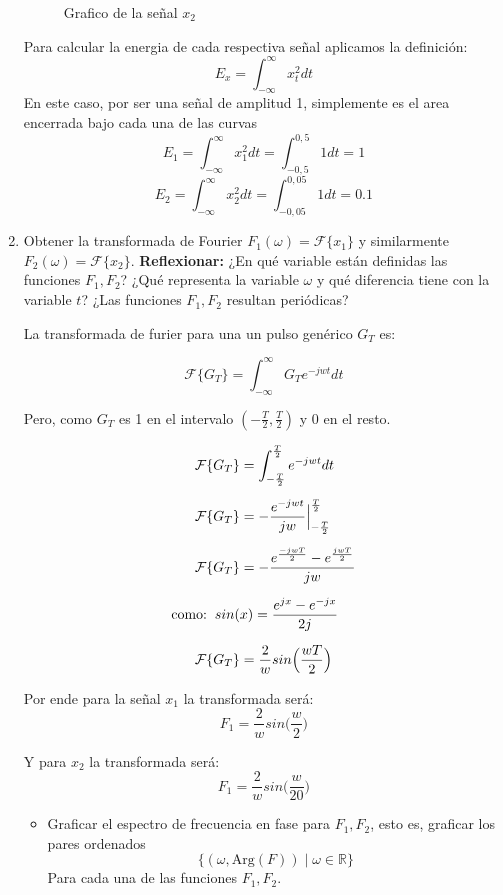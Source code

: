 \documentclass[12pt,a4paper]{report}
\begin{document}
\begin{enumerate}[label=\alph*),left=0pt]
\begin{figure}[h!]
\begin{minipage}{0.45\textwidth}
        \caption{Grafico de la señal $x_2$}
        \label{fig:imagen2}
      \end{minipage}
    \end{figure}

    Para calcular la energia de cada respectiva señal aplicamos la definición:
    $$E_x = \int_{-\infty}^{\infty}x_t^2dt$$
    En este caso, por ser una señal de amplitud 1, simplemente es el area encerrada bajo cada una de las curvas
    $$E_1 = \int_{-\infty}^{\infty}x_1^2dt= \int_{-0,5}^{0,5}1dt=1$$
    $$E_2 = \int_{-\infty}^{\infty}x_2^2dt= \int_{-0,05}^{0,05}1dt=0.1$$

  \item Obtener la transformada de Fourier $F_1(\omega) = \mathcal{F}\{x_1\}$ y similarmente $F_2(\omega) =
    \mathcal{F}\{x_2\}$. \textbf{Reflexionar:} ¿En qué variable están definidas las funciones $F_1, F_2$?
    ¿Qué representa la variable $\omega$ y qué diferencia tiene con la variable $t$? 
    ¿Las funciones $F_1, F_2$ resultan periódicas?

    La transformada de furier para una un pulso genérico $G_T$ es:

    $$\mathcal{F}\{G_T\} = \int_{-\infty}^{\infty}G_T e^{-jwt}dt$$

    Pero, como $G_T$ es 1 en el intervalo $(-\frac{T}{2},\frac{T}{2})$ y 0 en el resto.

    $$
    \begin{aligned}
      \mathcal{F}\{G_T\} &= \int_{-\frac{T}{2}}^{\frac{T}{2}}e^{-jwt}dt \\[6pt]
      \mathcal{F}\{G_T\} &= -\frac{e^{-jwt}}{jw}\Big|^{\frac{T}{2}}_{-\frac{T}{2}} \\[6pt]
      \mathcal{F}\{G_T\} &= -\frac{e^{\frac{-jwT}{2}}-e^{\frac{jwT}{2}}}{jw}\\[6pt]
      \text{como:} \hspace{2mm} sin(&x)=\frac{e^{jx}-e^{-jx}}{2j}\\[6pt]
      \mathcal{F}\{G_T\} &= \frac{2}{w}sin\Big(\frac{wT}{2}\Big)
    \end{aligned}
    $$

    Por ende para la señal $x_1$ la transformada será:
    $$F_1= \frac{2}{w}sin\Big(\frac{w}{2}\Big)$$

    Y para $x_2$ la transformada será:
    $$F_1= \frac{2}{w}sin\Big(\frac{w}{20}\Big)$$

    \begin {itemize}[left=0pt]

      \item Graficar el espectro de frecuencia en fase para $F_1, F_2$, esto es, graficar los pares ordenados
        $$\{(\omega, \text{Arg}(F)) \mid \omega \in \mathbb{R}\}$$
        Para cada una de las funciones $F_1, F_2$.\newline


\end{itemize}
\end{enumerate}
\end{document}
